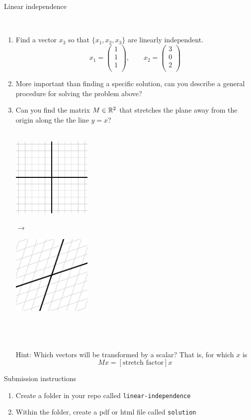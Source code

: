 \documentclass{article}
\begin{document}
\raggedright\noindent
{\Large Linear independence}

\ \\

\begin{enumerate}
\item Find a vector $x_3$ so that $\{x_1, x_2, x_3\}$ are linearly independent.
\[
x_1 = \left( \begin{array}{c} 1 \\ 1 \\ 1\\ \end{array} \right) , \qquad x_2 = \left( \begin{array}{c} 3 \\ 0 \\ 2\\ \end{array} \right)
\]

\item More important than finding a specific solution, can you describe a general procedure for solving the problem above?

\item Can you find the matrix $M\in {\Bbb R}^2$ that stretches the plane away from the origin along the the line $y=x$?\\ \ \\
{
    \centering
    \begin{minipage}{2.1in}
      \centering
      \includegraphics[width=1.5in]{xyplane.pdf}
    \end{minipage}
    $\to$
    \begin{minipage}{2.1in}
      \centering
      \includegraphics[width=1.5in]{xyplane-stretch.pdf}
    \end{minipage}
}\\ \ \\ \ \\
Hint: Which vectors will be transformed by a scalar?  That is, for which $x$ is
\[ Mx = [\text{stretch factor}]x\]
\end{enumerate}

{\large Submission instructions}
\begin{enumerate}
\item Create a folder in your repo called {\tt linear-independence}
\item Within the folder, create a pdf or html file called {\tt solution}
\end{enumerate}
\end{document}
